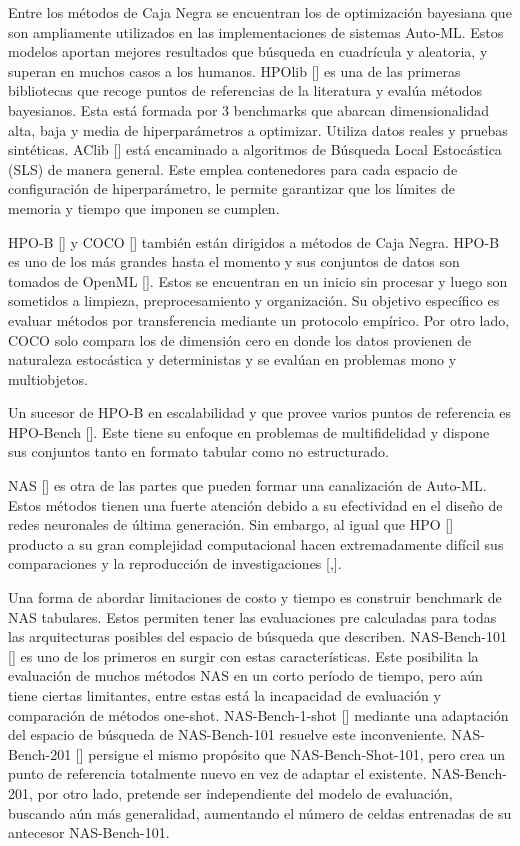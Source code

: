 Entre los métodos de Caja Negra se encuentran los de optimización bayesiana que son ampliamente utilizados en las implementaciones de sistemas Auto-ML. Estos modelos
aportan mejores resultados que búsqueda en cuadrícula y aleatoria, y superan en muchos casos a los humanos. HPOlib [\cite{63}] es una de las primeras 
bibliotecas que recoge puntos de referencias de la literatura y evalúa métodos bayesianos. Esta está formada por 3 benchmarks que abarcan dimensionalidad alta, baja y 
media de hiperparámetros a optimizar. Utiliza datos reales y pruebas sintéticas. AClib [\cite{62}] está encaminado a algoritmos de Búsqueda Local Estocástica (SLS) 
de manera general. Este emplea contenedores para cada espacio de configuración de hiperparámetro, le permite garantizar que los límites de memoria y tiempo que imponen 
se cumplen. 

HPO-B [\cite{61}] y COCO [\cite{60}] también están dirigidos a métodos de Caja Negra. HPO-B es uno de los más grandes hasta el momento y sus conjuntos de datos son 
tomados de OpenML [\cite{43}]. Estos se encuentran en un inicio sin procesar y luego son sometidos a limpieza, preprocesamiento y organización. 
Su objetivo específico es evaluar métodos por transferencia mediante un protocolo empírico. Por otro lado, COCO solo compara los de dimensión cero en donde los datos 
provienen de naturaleza estocástica y deterministas y se evalúan en problemas mono y multiobjetos.

Un sucesor de HPO-B en escalabilidad y que provee varios puntos de referencia es HPO-Bench [\cite{50}]. Este tiene su enfoque en problemas de multifidelidad y 
dispone sus conjuntos tanto en formato tabular como no estructurado. 

NAS [\cite{35}] es otra de las partes que pueden formar una canalización de Auto-ML. Estos métodos tienen una fuerte atención debido a su efectividad en el diseño de 
redes neuronales de última generación. Sin embargo, al igual que HPO [\cite{35}] producto a su gran complejidad computacional hacen extremadamente difícil sus 
comparaciones y la reproducción de investigaciones [\cite{55},\cite{59}].

Una forma de abordar limitaciones de costo y tiempo es construir benchmark de NAS tabulares. Estos permiten tener las evaluaciones 
pre calculadas para todas las arquitecturas posibles del espacio de búsqueda que describen. NAS-Bench-101 [\cite{49}] es uno de los primeros en surgir con estas 
características. Este posibilita la evaluación de muchos métodos NAS en un corto período de tiempo, pero aún tiene ciertas limitantes, entre estas está la incapacidad de 
evaluación y comparación de métodos one-shot. NAS-Bench-1-shot [\cite{55}] mediante una adaptación del espacio de búsqueda de NAS-Bench-101 resuelve este inconveniente. 
NAS-Bench-201 [\cite{56}] persigue el mismo propósito que NAS-Bench-Shot-101, pero crea un punto de referencia totalmente nuevo en vez de adaptar el existente. 
NAS-Bench-201, por otro lado, pretende ser independiente del modelo de evaluación, buscando aún más generalidad, aumentando el número de celdas entrenadas de su antecesor 
NAS-Bench-101.

